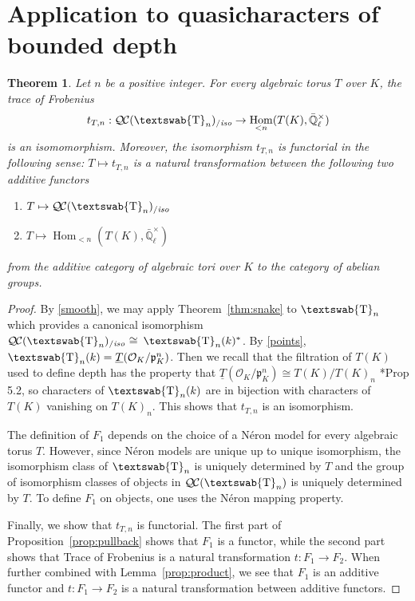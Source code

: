 \documentclass[11pt]{amsart}
\newcommand{\mathswab}[1]{\operatorname{\textswab{#1}}}
\theoremstyle{plain}
\newtheorem{theorem}{Theorem}[section]
\theoremstyle{definition}
\theoremstyle{remark}
\newcommand{\EE}{\mathbb{\bar Q}_\ell}
\newcommand{\OK}{\mathcal{O}_K}
\newcommand{\pK}{\mathfrak{p}_K}
\newcommand{\Fq}{k}
\newcommand{\EEx}{\EE^\times}
\DeclareMathOperator{\Hom}{Hom}
\newcommand{\iso}{{\ \cong\ }}
\newcommand{\GN}[1]{\mathswab{#1}}
\newcommand{\TT}{\underline{T}}
\newcommand{\QC}{{\mathcal{Q\hskip-0.8pt C}}}
\newcommand{\QCiso}[1]{\QC(#1)_{/\textit{iso}}}
\newcommand{\trFrob}[1]{t_{#1}}
\newcommand\Clifton[1]{\marginpar{\smaller\smaller CC: #1}}
\begin{document}
\section{Application to quasicharacters of bounded depth} \label{sec:bdchar}

\begin{theorem}\label{thm:application}
Let $n$ be a positive integer.
For every algebraic torus $T$ over $K$, the trace of Frobenius 
  \[
\trFrob{T,n}:  \QCiso{\GN{T}_n} \to \Hom_{< n}(T(K),\EEx)
  \]
is an isomomorphism. 
Moreover, the isomorphism $\trFrob{T,n}$ is functorial in the following sense:
$T \mapsto \trFrob{T,n}$ is a natural transformation between the following two additive functors
\begin{enumerate}
\item[$F_1$:] $T \mapsto \QCiso{\GN{T}_n}$
\item[$F_2$:] $T \mapsto \Hom_{<n}(T(K),\EEx)$
\end{enumerate}
from the additive category of algebraic tori over $K$ to the category of abelian groups.
\end{theorem}

\begin{proof}
  By \ref{smooth}, we may apply Theorem~\ref{thm:snake} to
  $\GN{T}_n$ which provides a canonical isomorphism
  $\QCiso{\GN{T}_n} \iso \GN{T}_n(\Fq)^*$.
  By \ref{points}, $\GN{T}_n(\Fq) = \TT(\OK/\pK^n)$.
  Then we recall that the filtration of $T(K)$ used to
  define depth has the property that $\TT(\OK/\pK^n) \cong T(K) / T(K)_n$
  \cite{yu:03a}*{Prop 5.2}, so characters of $\GN{T}_n(\Fq)$ 
  are in bijection with characters of $T(K)$ vanishing on $T(K)_n$. 
  This shows that $\trFrob{T,n}$ is an isomorphism.

  The definition of $F_1$ depends 
  on the choice of a Néron model for every algebraic torus $T$.
  However, since Néron models are unique up to unique isomorphism,
  the isomorphism class of $\GN{T}_n$ is uniquely determined by $T$
  \Clifton{Hmmm}
  and the group of isomorphism classes of objects in $\QC(\GN{T}_n)$ 
  is uniquely determined by $T$. 
  To define $F_1$ on objects, one uses the Néron mapping property.
  
  Finally, we show that $\trFrob{T,n}$ is functorial.
The first part of Proposition~\ref{prop:pullback} shows that $F_1$ is a functor,
while the second part shows that Trace of Frobenius is a natural transformation
$t: F_1 \to F_2$. When further combined with Lemma~\ref{prop:product},
we see that $F_1$ is an additive functor and $t: F_1 \to F_2$ is a
natural transformation between additive functors.
\end{proof}
\end{document}
